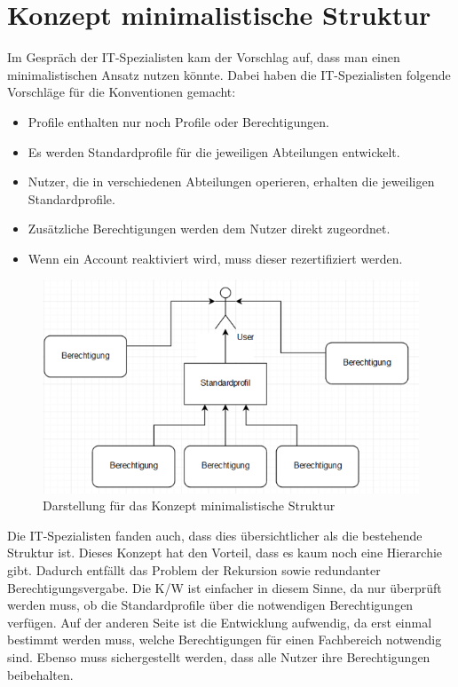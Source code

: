 \section{Konzept minimalistische Struktur}
\label{sec:chapter04:minimal}
Im Gespräch der IT-Spezialisten kam der Vorschlag auf, dass man einen minimalistischen Ansatz nutzen könnte.
Dabei haben die IT-Spezialisten folgende Vorschläge für die Konventionen gemacht:
\newline
\begin{itemize}
	\item Profile enthalten nur noch Profile oder Berechtigungen.
	\item Es werden Standardprofile für die jeweiligen Abteilungen entwickelt.
	\item Nutzer, die in verschiedenen Abteilungen operieren, erhalten die jeweiligen Standardprofile.
	\item Zusätzliche Berechtigungen werden dem Nutzer direkt zugeordnet.
	\item Wenn ein Account reaktiviert wird, muss dieser rezertifiziert werden.
\end{itemize}
\begin{figure}[h!]
 \centering
 \includegraphics[width=1\textwidth]{gfx/Picture/Minimal.PNG}
 \caption{Darstellung für das Konzept minimalistische Struktur}
 \label{fig:Min}
\end{figure}
Die IT-Spezialisten fanden auch, dass dies übersichtlicher als die bestehende Struktur ist.
Dieses Konzept hat den Vorteil, dass es kaum noch eine Hierarchie gibt.
Dadurch entfällt das Problem der Rekursion sowie redundanter Berechtigungsvergabe.
Die \ac{K/W} ist einfacher in diesem Sinne, da nur überprüft werden muss, ob die Standardprofile über die notwendigen Berechtigungen verfügen.
Auf der anderen Seite ist die Entwicklung aufwendig, da erst einmal bestimmt werden muss, welche Berechtigungen für einen Fachbereich notwendig sind. Ebenso muss sichergestellt werden, dass alle Nutzer ihre Berechtigungen beibehalten.
